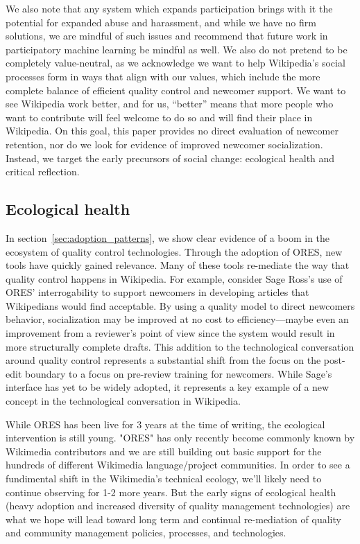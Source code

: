 We also note that any system which expands participation brings with it the potential for expanded abuse and harassment, and while we have no firm solutions, we are mindful of such issues and recommend that future work in participatory machine learning be mindful as well. We also do not pretend to be completely value-neutral, as we acknowledge we want to help Wikipedia's social processes form in ways that align with our values, which include the more complete balance of efficient quality control and newcomer support. We want to see Wikipedia work better, and for us, ``better'' means that more people who want to contribute will feel welcome to do so and will find their place in Wikipedia. On this goal, this paper provides no direct evaluation of newcomer retention, nor do we look for evidence of improved newcomer socialization. Instead, we target the early precursors of social change: ecological health and critical reflection.

\subsection{Ecological health}
In section~\ref{sec:adoption_patterns}, we show clear evidence of a boom in the ecosystem of quality control technologies.  Through the adoption of ORES, new tools have quickly gained relevance.  Many of these tools re-mediate the way that quality control happens in Wikipedia.  For example, consider Sage Ross's use of ORES' interrogability to support newcomers in developing articles that Wikipedians would find acceptable.  By using a quality model to direct newcomers behavior, socialization may be improved at no cost to efficiency---maybe even an improvement from a reviewer's point of view since the system would result in more structurally complete drafts.  This addition to the technological conversation around quality control represents a substantial shift from the focus on the post-edit boundary\cite{geiger2012defense} to a focus on pre-review training for newcomers.  While Sage's interface has yet to be widely adopted, it represents a key example of a new concept in the technological conversation in Wikipedia.

While ORES has been live for 3 years at the time of writing, the ecological intervention is still young.  "ORES" has only recently become commonly known by Wikimedia contributors and we are still building out basic support for the hundreds of different Wikimedia language/project communities.  In order to see a fundimental shift in the Wikimedia's technical ecology, we'll likely need to continue observing for 1-2 more years.  But the early signs of ecological health (heavy adoption and increased diversity of quality management technologies) are what we hope will lead toward long term and continual re-mediation of quality and community management policies, processes, and technologies.

